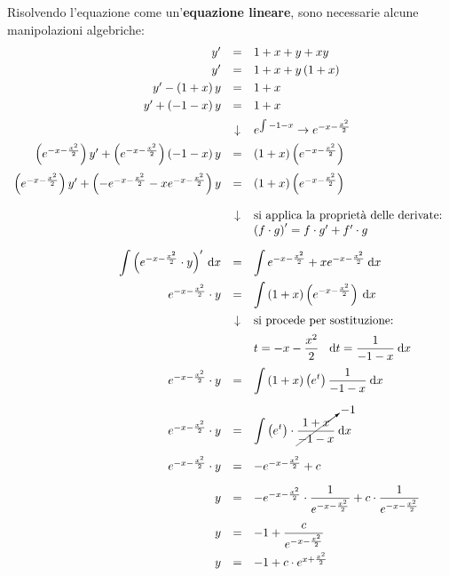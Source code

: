 \documentclass[a4paper]{article}
\begin{document}
	\noindent
	Risolvendo l'equazione come un'\textbf{equazione lineare}, sono necessarie alcune manipolazioni algebriche:
	\begin{equation*}
		\begin{array}{rcl}
			y' &=& 1 + x + y + xy \\ [.3em]
			y' &=& 1 + x + y\left(1 + x\right) \\ [.3em]
			y' - \left(1 + x\right)y &=& 1 + x \\ [.3em]
			y' + \left(-1 - x\right)y &=& 1 + x \\ [.5em]
			&\downarrow& e^{\int -1-x} \rightarrow e^{-x-\frac{x^{2}}{2}} \\ [.5em]
			\left(e^{-x-\frac{x^{2}}{2}}\right)y' + \left(e^{-x-\frac{x^{2}}{2}}\right)\left(-1-x\right)y &=& \left(1+x\right) \left(e^{-x-\frac{x^{2}}{2}}\right) \\ [1em]
			\left(e^{-x-\frac{x^{2}}{2}}\right)y' + \left(-e^{-x-\frac{x^{2}}{2}} - xe^{-x-\frac{x^{2}}{2}}\right)y &=& \left(1+x\right) \left(e^{-x-\frac{x^{2}}{2}}\right) \\ [1.5em]
			&\downarrow& \text{si applica la proprietà delle derivate: } \\
			&& \left(f \cdot g\right)' = f\cdot g' + f'\cdot g \\ [1em]
			\displaystyle\int\left(e^{-x-\frac{x^{2}}{2}} \cdot y\right)' \:\mathrm{d}x &=& \displaystyle\int e^{-x-\frac{x^{2}}{2}} + x e^{-x-\frac{x^{2}}{2}} \:\mathrm{d}x \\ [1em]
			e^{-x-\frac{x^{2}}{2}} \cdot y &=& \displaystyle\int \left(1+x\right) \left(e^{-x-\frac{x^{2}}{2}}\right) \:\mathrm{d}x \\ [1em]
			&\downarrow& \text{si procede per sostituzione:} \\ [.5em]
			&& t = -x-\dfrac{x^{2}}{2} \:\:\:\: \mathrm{d}t = \dfrac{1}{-1-x} \:\mathrm{d}x \\ [1em]
			e^{-x-\frac{x^{2}}{2}} \cdot y &=& \displaystyle\int \left(1+x\right) \left(e^{t}\right) \dfrac{1}{-1-x} \:\mathrm{d}x \\ [1.5em]
			e^{-x-\frac{x^{2}}{2}} \cdot y &=& \displaystyle\int \left(e^{t}\right) \cdot \cancelto{-1}{\dfrac{1+x}{-1-x}} \:\mathrm{d}x \\ [1.5em]
			e^{-x-\frac{x^{2}}{2}} \cdot y &=& -e^{-x-\frac{x^{2}}{2}} + c \\ [1em]
			y &=& -e^{-x-\frac{x^{2}}{2}} \cdot \dfrac{1}{e^{-x-\frac{x^{2}}{2}}} + c \cdot \dfrac{1}{e^{-x-\frac{x^{2}}{2}}} \\ [1.5em]
			y &=& -1 + \dfrac{c}{e^{-x-\frac{x^{2}}{2}}} \\ [1em]
			y &=& -1 + c \cdot e^{x+\frac{x^{2}}{2}}
		\end{array}
	\end{equation*}
\end{document}
